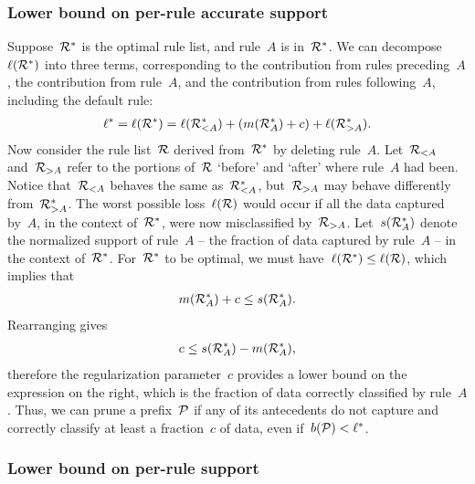 \subsubsection{Lower bound on per-rule accurate support}

Suppose~${\mathcal R}^*$ is the optimal rule list, and rule~$A$ is in~${\mathcal R}^*$.
%
We can decompose~$\ell({\mathcal R}^*)$ into three terms, corresponding to
the contribution from rules preceding~$A$, the contribution from rule~$A$,
and the contribution from rules following~$A$, including the default rule:
\begin{align}
\ell^* = \ell(\RL^*) = \ell(\RL_{<A}^*) + (m(\RL_A^*) + c) + \ell(\RL_{>A}^*).
\end{align}
%
Now consider the rule list~${\mathcal R}$ derived from~${\mathcal R}^*$ by deleting rule~$A$.
%
Let~${\mathcal R}_{<A}$ and~${\mathcal R}_{>A}$ refer to the portions of~${\mathcal R}$
`before' and `after' where rule~$A$ had been.
%
Notice that~${\mathcal R}_{<A}$ behaves the same as~${\mathcal R}_{<A}^*$,
but~${\mathcal R}_{>A}$ may behave differently from~${\mathcal R}_{>A}^*$.
%
%
The worst possible loss~$\ell({\mathcal R})$ would occur if all the data captured by~$A$,
in the context of~${\mathcal R}^*$, were now misclassified by~${\mathcal R}_{>A}$.
%
Let~$s({\mathcal R}_A^*)$ denote the normalized support of rule~$A$ --
\ie the fraction of data captured by rule~$A$ -- in the context of~${\mathcal R}^*$.
%
For~${\mathcal R}^*$ to be optimal, we must have~${\ell({\mathcal R}^*) \le \ell({\mathcal R})}$, which implies that
\begin{align}
m(\RL_A^*) + c \le s(\RL_A^*).
\end{align}
Rearranging gives
\begin{align}
c \le s(\RL_A^*) - m(\RL_A^*),
\label{eq:min-capture-correct}
\end{align}
therefore the regularization parameter~$c$ provides a lower bound on the expression
on the right, which is the fraction of data correctly classified by rule~$A$.
%
Thus, we can prune a prefix~${\mathcal P}$ if any of its antecedents do not capture and
correctly classify at least a fraction~$c$ of data, even if~${b({\mathcal P}) < \ell^*}$.

\subsubsection{Lower bound on per-rule support}

